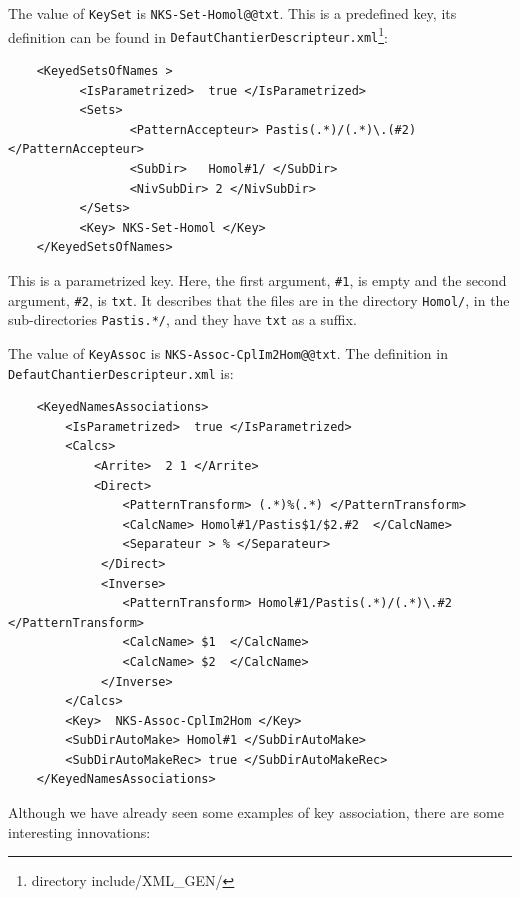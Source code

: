 The value of {\tt KeySet} is {\tt NKS-Set-Homol@@txt}. This is a predefined key,
its definition can be found in
{\tt DefautChantierDescripteur.xml}\footnote{directory include/XML\_GEN/}:


{\scriptsize
\begin{verbatim}
    <KeyedSetsOfNames >
          <IsParametrized>  true </IsParametrized>
          <Sets>
                 <PatternAccepteur> Pastis(.*)/(.*)\.(#2)  </PatternAccepteur>
                 <SubDir>   Homol#1/ </SubDir>
                 <NivSubDir> 2 </NivSubDir>
          </Sets>
          <Key> NKS-Set-Homol </Key>
    </KeyedSetsOfNames>
\end{verbatim}
}

This is a parametrized key. Here, the first argument, {\tt \#1}, is empty and
the second argument, {\tt \#2}, is {\tt txt}.
It describes that the files are in the directory {\tt Homol/}, in the sub-directories {\tt Pastis.*/},
and they have {\tt txt} as a suffix.


The value of {\tt KeyAssoc} is {\tt NKS-Assoc-CplIm2Hom@@txt}.
The definition in {\tt DefautChantierDescripteur.xml} is:

{\scriptsize
\begin{verbatim}
    <KeyedNamesAssociations>
        <IsParametrized>  true </IsParametrized>
        <Calcs>
            <Arrite>  2 1 </Arrite>
            <Direct>
                <PatternTransform> (.*)%(.*) </PatternTransform>
                <CalcName> Homol#1/Pastis$1/$2.#2  </CalcName>
                <Separateur > % </Separateur>
             </Direct>
             <Inverse>
                <PatternTransform> Homol#1/Pastis(.*)/(.*)\.#2 </PatternTransform>
                <CalcName> $1  </CalcName>
                <CalcName> $2  </CalcName>
             </Inverse>
        </Calcs>
        <Key>  NKS-Assoc-CplIm2Hom </Key>
        <SubDirAutoMake> Homol#1 </SubDirAutoMake>
        <SubDirAutoMakeRec> true </SubDirAutoMakeRec>
    </KeyedNamesAssociations>
\end{verbatim}
}

Although we have already seen some examples of key association, there are
some interesting innovations:

